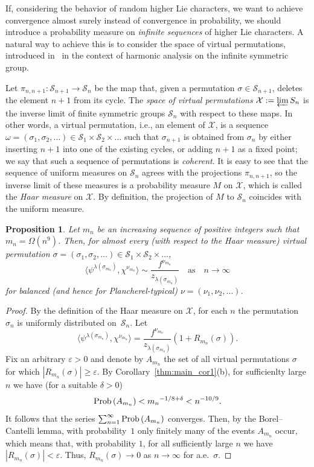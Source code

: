 \documentclass[12pt]%
{amsart}
\renewcommand\S{{\mathcal S}}
\newcommand\X{{\mathcal X}}
\newcommand{\la}{{\lambda}}
\newcommand{\si}{{\sigma}}
\newcommand{\Prob}{{\rm Prob}}
\theoremstyle{plain}
\newtheorem{proposition}[theorem]{Proposition}
\theoremstyle{definition}
\theoremstyle{remark}
\newcommand{\ve}{\varepsilon}
\begin{document}
If, considering the behavior of random higher Lie characters, we want to achieve convergence almost surely instead of convergence in probability, we should introduce a probability measure on {\em infinite sequences} of higher Lie characters. A natural way to achieve this is to consider the space of virtual permutations, introduced in~\cite{KOV} in the context of harmonic analysis on the infinite symmetric group.

Let $\pi_{n,n+1}:\S_{n+1} \to \S_{n}$ be the map that, given a permutation $\si\in\S_{n+1}$, deletes the element $n+1$ from its cycle. The  {\it space of virtual permutations} $\X:=\varprojlim S_n$ is the inverse limit of finite symmetric groups $\S_n$ with respect to these maps. In other words, a virtual permutation, i.e., an element of $\X$, is a sequence $\omega =(\si_1,\si_2,\ldots) \in \S_1\times\S_2\times\ldots$ such that $\si_{n+1}$ is obtained from $\si_n$ by either inserting $n+1$ into one of the existing cycles, or adding $n+1$ as a fixed point; we say that such a sequence of permutations is {\it coherent}.
It is easy to see that the sequence of uniform measures on $\S_n$ agrees with the projections $\pi_{n,n+1}$, so the inverse limit of these measures is a probability measure $M$ on $\X$, which is called the {\it Haar measure} on $\X$. By definition, the projection of $M$ to $\S_n$ coincides with the uniform measure.

\begin{proposition}\label{lem:virtual}
    Let $m_n$ be an increasing sequence of positive integers such that $m_n = \Omega(n^{9})$. 
    Then, for almost every (with respect to the Haar measure) virtual permutation $\sigma =(\si_1,\si_2,\ldots) \in \S_1\times\S_2\times\ldots$,  
    \[
        \langle \psi^{\la(\si_{m_n})},\chi^{\nu_{m_n}} \rangle
        \sim \frac{f^{\nu_{m_n}}}{z_{\la(\si_{m_n})}} 
        \quad \text{as} \quad n \to \infty
   \]
   for balanced (and hence for Plancherel-typical) $\nu=(\nu_1,\nu_2,\ldots)$.
\end{proposition}

\begin{proof}
By the definition of the Haar measure on $\X$, for each $n$ the permutation $\si_n$ is uniformly distributed on~$\S_n$. Let
    \[
        \langle \psi^{\la(\si_{m_n})},\chi^{\nu_{m_n}} \rangle 
        = \frac{f^{\nu_{m_n}}}{z_{\la(\si_{m_n})}} (1+R_{m_n}(\sigma)). 
    \]
Fix an arbitrary $\ve>0$ and denote by $A_{m_n}$ the set of all virtual permutations $\si$
for which $|R_{m_n}(\si)|\ge\ve$. 
By Corollary~\ref{thm:main_cor1}(b),  
for sufficienlty large $n$
we have (for a suitable $\delta > 0$)
    \[
        \Prob\,(A_{m_n}) 
        < {m_n}^{-1/8 + \delta}
        < n^{-10/9}.
    \]
It follows that the series 
$\sum_{n=1}^\infty \Prob\,(A_{m_n})$ converges. Then, by the Borel--Cantelli lemma,
with probability~$1$ only finitely many of the events $A_{m_n}$ occur, which means that, with probability $1$, for all sufficiently large $n$ we have $|R_{m_n}(\si)|<\ve$. Thus, 
$R_{m_n}(\si)\to0$ as $n\to\infty$
for a.e.\ $\si$.
\end{proof}
\end{document}
